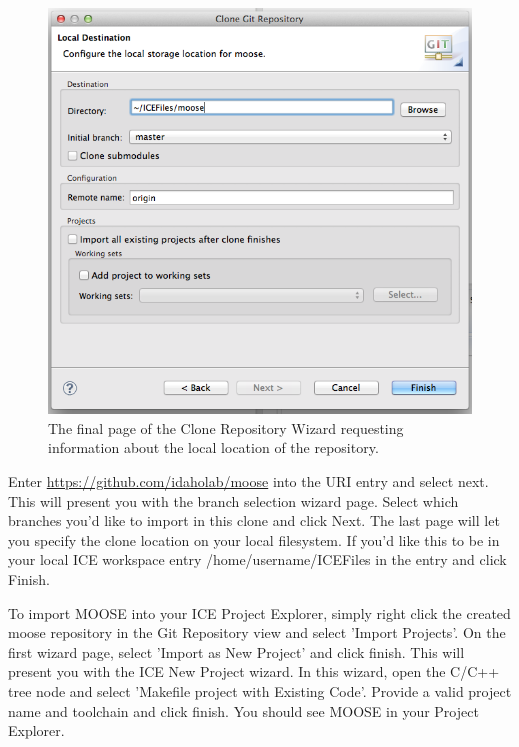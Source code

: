 \begin{figure}[htbp]
\centering
\includegraphics[width=\textwidth]{figures/clone_wizard3.png}
\caption{The final page of the Clone Repository Wizard requesting information about the local location of the repository.}
\end{figure}

Enter \url{https://github.com/idaholab/moose} into the URI entry and
select next. This will present you with the branch selection wizard
page. Select which branches you'd like to import in this clone and click
Next. The last page will let you specify the clone location on your
local filesystem. If you'd like this to be in your local ICE workspace
entry /home/username/ICEFiles in the entry and click Finish.

To import MOOSE into your ICE Project Explorer, simply right click the
created moose repository in the Git Repository view and select 'Import
Projects'. On the first wizard page, select 'Import as New Project' and
click finish. This will present you with the ICE New Project wizard. In
this wizard, open the C/C++ tree node and select 'Makefile project with
Existing Code'. Provide a valid project name and toolchain and click
finish. You should see MOOSE in your Project Explorer.

